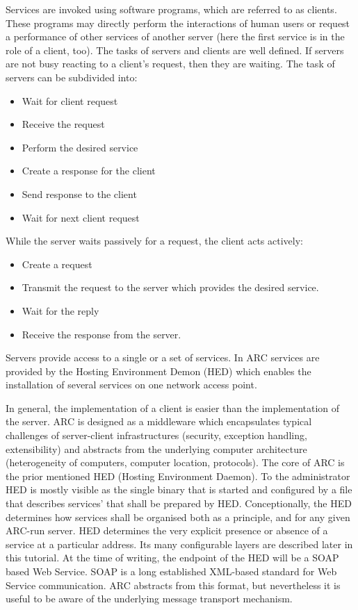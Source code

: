 Services are invoked using software programs, which are referred to as clients. 
These programs may directly perform the interactions of human users or request a performance of other services of another server (here the first service is in the role of a client, too).
The tasks of servers and clients are well defined. If servers are not busy reacting to a client's request, then they are waiting. The task of servers can be subdivided into:
\begin{itemize}
 \item Wait for client request
 \item Receive the request
 \item Perform the desired service
 \item Create a response for the client
 \item Send response to the client
 \item Wait for next client request
\end{itemize}
While the server waits passively for a request, the client acts actively:
\begin{itemize}
 \item Create a request
 \item Transmit the request to the server which provides the desired service.
 \item Wait for the reply
 \item Receive the response from the server.
 \end{itemize}
Servers provide access to a single or a set of services. In ARC services are provided by the Hosting Environment Demon (HED) which enables the installation of several services on one network access point. 
\forcelinebreak

In general, the implementation of a client is easier than the implementation of the server. 
ARC is designed as a middleware which encapsulates typical challenges of server-client infrastructures (security, exception handling, extensibility) and abstracts from the underlying computer architecture (heterogeneity of computers, computer location, protocols).
The core of ARC is the prior mentioned HED (Hosting Environment Daemon).
To the administrator HED is mostly visible as the single binary that is started and configured by a file that describes services' that shall be prepared by HED. 
Conceptionally, the HED determines how services shall be organised both as a principle, and for any given ARC-run server.
HED determines the very explicit presence or absence of a service at a particular address. Its many configurable layers are described later in this tutorial. 
%
At the time of writing, the endpoint of the HED will be a SOAP based  Web Service.
SOAP is a long established XML-based standard for Web Service communication.
ARC abstracts from this format, but nevertheless it is useful to be aware of
the underlying message transport mechanism.

